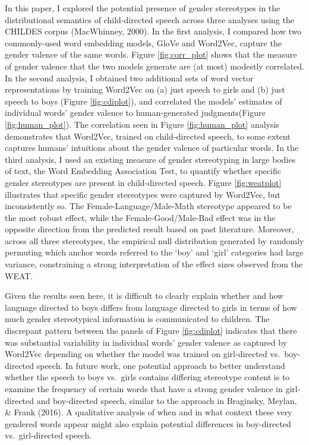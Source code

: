 \documentclass[10pt, letterpaper]{article}
\begin{document}
In this paper, I explored the potential presence of gender stereotypes
in the distributional semantics of child-directed speech across three
analyses using the CHILDES corpus (MacWhinney, 2000). In the first
analysis, I compared how two commonly-used word embedding models, GloVe
and Word2Vec, capture the gender valence of the same words. Figure
\ref{fig:corr_plot} shows that the measure of gender valence that the
two models generate are (at most) modestly correlated. In the second
analysis, I obtained two additional sets of word vector representations
by training Word2Vec on (a) just speech to girls and (b) just speech to
boys (Figure \ref{fig:cdiplot}), and correlated the models' estimates of
individual words' gender valence to human-generated judgments(Figure
\ref{fig:human_plot}). The correlation seen in Figure
\ref{fig:human_plot} analysis demonstrates that Word2Vec, trained on
child-directed speech, to some extent captures humans' intuitions about
the gender valence of particular words. In the third analysis, I used an
existing measure of gender stereotyping in large bodies of text, the
Word Embedding Association Test, to quantify whether specific gender
stereotypes are present in child-directed speech. Figure
\ref{fig:weatplot} illustrates that specific gender stereotypes were
captured by Word2Vec, but inconsistently so. The
Female-Language/Male-Math stereotype appeared to be the most robust
effect, while the Female-Good/Male-Bad effect was in the opposite
direction from the predicted result based on past literature. Moreover,
across all three stereotypes, the empirical null distribution generated
by randomly permuting which anchor words referred to the `boy' and
`girl' categories had large variance, constraining a strong
interpretation of the effect sizes observed from the WEAT.

Given the results seen here, it is difficult to clearly explain whether
and how language directed to boys differs from language directed to
girls in terms of how much gender stereotypical information is
communicated to children. The discrepant pattern between the panels of
Figure \ref{fig:cdiplot} indicates that there was substantial
variability in individual words' gender valence as captured by Word2Vec
depending on whether the model was trained on girl-directed
vs.~boy-directed speech. In future work, one potential approach to
better understand whether the speech to boys vs.~girls contains
differing stereotype content is to examine the frequency of certain
words that have a strong gender valence in girl-directed and
boy-directed speech, similar to the approach in Braginsky, Meylan, \&
Frank (2016). A qualitative analysis of when and in what context these
very gendered words appear might also explain potential differences in
boy-directed vs.~girl-directed speech.
\end{document}
